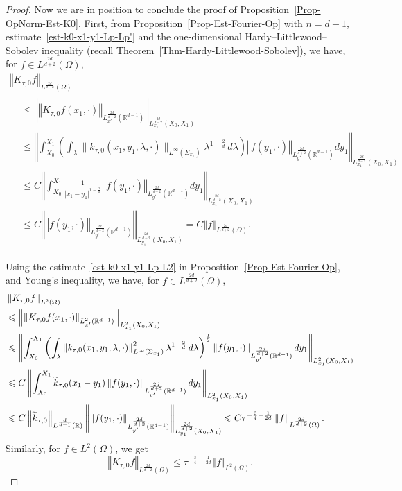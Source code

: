 \documentclass[10pt]{amsart}
\theoremstyle{definition}\newtheorem{defi}[theo]{Definition}\newtheorem{rema}[theo]{Remark}\newtheorem{exam}[theo]{Example}\newtheorem{exem}[theo]{Example}\newtheorem{nota}[theo]{Notation}
\newcommand*\R{\mathbb{R}}
\newcommand{\norm}[1]{\left\Vert#1\right\Vert}
\renewcommand{\leq}{\leqslant}
\renewcommand{\tilde}{\widetilde}
\let\oldtilde\tilde
\renewcommand*{\tilde}[1]{\mathchoice{\widetilde{#1}}{\widetilde{#1}}{\oldtilde{#1}}{\oldtilde{#1}}}
\begin{document}
\begin{proof}
Now we are in position to conclude the proof of Proposition~\ref{Prop-OpNorm-Est-K0}. First, from Proposition~\ref{Prop-Est-Fourier-Op} with $n = d-1$, estimate~\eqref{est-k0-x1-y1-Lp-Lp'} and the one-dimensional Hardy--Littlewood--Sobolev inequality (recall Theorem~\ref{Thm-Hardy-Littlewood-Sobolev}), we have, for $f \in L^{\frac{2d}{d+2}}(\Omega)$,
\begin{multline*}
\norm{ K_{\tau, 0} f }_{L^{\frac{2d}{d-2}}(\Omega)}\\
\begin{aligned}
&\leq
\norm{ \norm{ K_{\tau, 0} f(x_1, \cdot) }_{L_{x'}^{\frac{2d}{d-2}}(\R^{d-1})}}_{L_{x_1}^{\frac{2d}{d-2}}(X_0,X_1)}
\\
&\leq
\norm{ \int_{X_0}^{X_1} \left(\int_{\lambda} \| k_{\tau, 0}(x_1, y_1, \lambda,\cdot)\|_{L^\infty(\Sigma_{x_1}) } \lambda^{1 - \frac{2}{d}} \, d\lambda\right) \norm{ f(y_1, \cdot)}_{L_{y'}^{\frac{2d}{d+2}}(\R^{d-1}) } d y_1 }_{L_{x_1}^{\frac{2d}{d-2}}(X_0,X_1)}
\\
&\leq C
\norm{ \int_{X_0}^{X_1} \frac{1}{|x_1 - y_1|^{1-\frac{2}{d}}} \norm{ f(y_1, \cdot)}_{L_{y'}^{\frac{2d}{d+2}}(\R^{d-1}) } d y_1 }_{L_{x_1}^{\frac{2d}{d-2}}(X_0,X_1)}
\\
&\leq C \norm{ \norm{ f(y_1, \cdot)}_{L_{y'}^{\frac{2d}{d+2}}(\R^{d-1}) }}_{L_{y_1}^{\frac{2d}{d+2}}(X_0,X_1)} = C \norm{f}_{L^{\frac{2d}{d+2}}(\Omega)}.
\end{aligned}
\end{multline*}

Using the estimate~\eqref{est-k0-x1-y1-Lp-L2} in Proposition~\ref{Prop-Est-Fourier-Op}, and Young's inequality, we have, for $f \in L^{\frac{2d}{d+2}}(\Omega)$,
\begingroup
\allowdisplaybreaks
\begin{align*}
&\norm{K_{\tau, 0} f}_{L^{2}(\Omega)}\\
&\leq
\norm{ \norm{ K_{\tau, 0} f(x_1, \cdot) }_{L_{x'}^{2}\left(\R^{d-1}\right)}}_{L_{x_1}^{2}(X_0, X_1)}
\\
&
\leq
\norm{ \int_{X_0}^{X_1} \left(\int_{\lambda} \left\| k_{\tau, 0}(x_1, y_1, \lambda,\cdot)\right\|^2_{L^\infty(\Sigma_{x_1}) } \lambda^{1 - \frac{2}{d}} \, d\lambda\right)^{\frac{1}{2}} \norm{ f(y_1, \cdot)}_{L_{y'}^{\frac{2d}{d+2}}(\R^{d-1}) }d y_1}_{L_{x_1}^{2}(X_0,X_1)}
\\
&\leq C
\norm{ \int_{X_0}^{X_1} \tilde k_{\tau,0}(x_1 -y_1) \norm{ f(y_1, \cdot)}_{L_{y'}^{\frac{2d}{d+2}}\left(\R^{d-1}\right)}d y_1 }_{L_{x_1}^{2}(X_0,X_1)}
\\
& \leq C \norm{\tilde k_{\tau,0}}_{L^{\frac{d}{d-1}}(\R)} \norm{ \norm{ f(y_1, \cdot)}_{L_{y'}^{\frac{2d}{d+2}}\left(\R^{d-1}\right)}}_{L_{y_1}^{\frac{2d}{d+2}}(X_0,X_1)} \leq C\tau^{-\frac{3}{4}-\frac{1}{2d}} \norm{f}_{L^{\frac{2d}{d+2}}(\Omega)}.
\end{align*}
\endgroup
Similarly, for $f \in L^{2}(\Omega)$, we get
\begin{equation}\label{Est-K-tau-0-L2-L2_*'}
\norm{ K_{\tau, 0} f}_{L^{\frac{2d}{d-2}}(\Omega)}
\leq
\tau^{-\frac{3}{4}-\frac{1}{2d}} \norm{f}_{L^{2}(\Omega)}.
\end{equation}


\end{proof}
\end{document}
